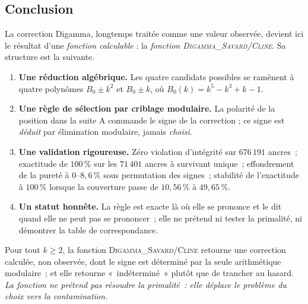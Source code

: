 \subsection{Conclusion}

La correction Digamma, longtemps traitée comme une valeur observée,
devient ici le résultat d'une \emph{fonction calculable} : la
\emph{fonction \textsc{Digamma\_Savard/Cline}}. Sa structure est la
suivante.

\begin{enumerate}[nosep,leftmargin=*]
  \item \textbf{Une réduction algébrique.} Les quatre candidats
    possibles se ramènent à quatre polynômes
    $B_0 \pm k^{2}$ et $B_0 \pm k$, où
    $B_0(k) = k^{5}-k^{3}+k-1$.
  \item \textbf{Une règle de sélection par criblage modulaire.} La
    polarité de la position dans la suite A commande le signe de la
    correction ; ce signe est \emph{déduit} par élimination
    modulaire, jamais \emph{choisi}.
  \item \textbf{Une validation rigoureuse.} Zéro violation
    d'intégrité sur $676\,191$ ancres~; exactitude de $100\,\%$ sur
    les $71\,401$ ancres à survivant unique~; effondrement de la
    pureté à $0$--$8{,}6\,\%$ sous permutation des signes~; stabilité
    de l'exactitude à $100\,\%$ lorsque la couverture passe de
    $10{,}56\,\%$ à $49{,}65\,\%$.
  \item \textbf{Un statut honnête.} La règle est exacte là où elle se
    prononce et le dit quand elle ne peut pas se prononcer~; elle ne
    prétend ni tester la primalité, ni démontrer la table de
    correspondance.
\end{enumerate}

\begin{boiteformule}
Pour tout $k \ge 2$, la fonction \textsc{Digamma\_Savard/Cline} retourne
une correction calculée, non observée, dont le signe est déterminé par
la seule arithmétique modulaire~; et elle retourne «~indéterminé~»
plutôt que de trancher au hasard. \emph{La fonction ne prétend pas
résoudre la primalité~: elle déplace le problème du \emph{choix} vers
la \emph{contamination}.}
\end{boiteformule}

